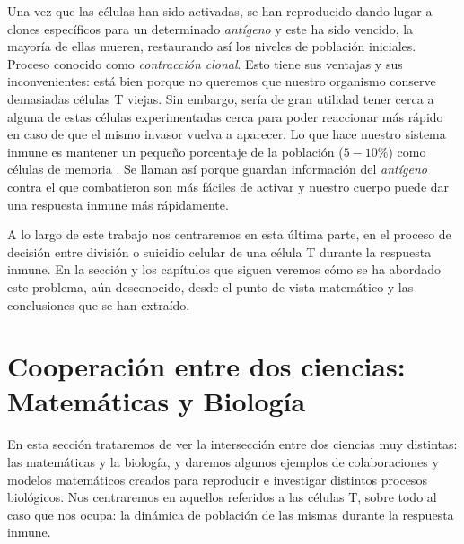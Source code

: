Una vez que las células han sido activadas, se han reproducido dando lugar a clones específicos para un determinado \textit{antígeno} y este ha sido vencido, la mayoría de ellas mueren, restaurando así los niveles de población iniciales. Proceso conocido como \textit{contracción clonal}. Esto tiene sus ventajas y sus inconvenientes: está bien porque no queremos que nuestro organismo conserve demasiadas células T viejas. Sin embargo, sería de gran utilidad tener cerca a alguna de estas células experimentadas cerca para poder reaccionar más rápido en caso de que el mismo invasor vuelva a aparecer. Lo que hace nuestro sistema inmune es mantener un pequeño porcentaje de la población  ($5-10\%$) como células de memoria \citep{JTB}. Se llaman así porque guardan información del \textit{antígeno} contra el que combatieron son más fáciles de activar y nuestro cuerpo puede dar una respuesta inmune más rápidamente.

A lo largo de este trabajo nos centraremos en esta última parte, en el proceso de decisión entre división o suicidio celular de una célula T durante la respuesta inmune. En la sección y los capítulos que siguen veremos cómo se ha abordado este problema, aún desconocido, desde el punto de vista matemático y las conclusiones que se han extraído. 


\section{Cooperación entre dos ciencias: Matemáticas y Biología}

En esta sección trataremos de ver la intersección entre dos ciencias muy distintas: las matemáticas y la biología, y daremos algunos ejemplos de colaboraciones y modelos matemáticos creados para reproducir e investigar distintos procesos biológicos. Nos centraremos en aquellos referidos a las células T, sobre todo al caso que nos ocupa: la dinámica de población de las mismas durante la respuesta inmune.

